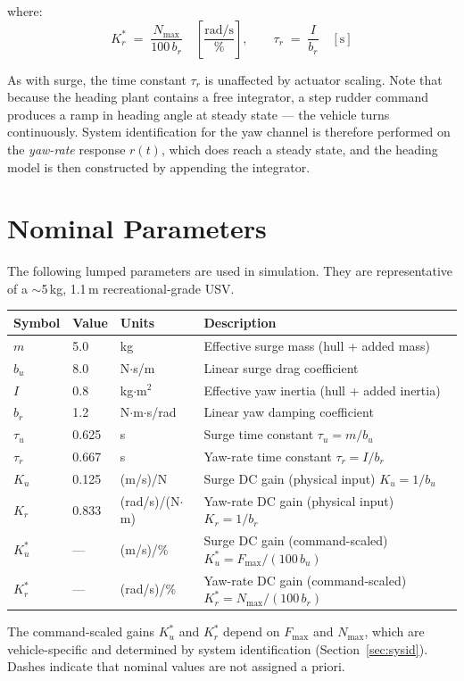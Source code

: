 \documentclass[11pt]{article}
\begin{document}
where:
\[
  K_r^* \;=\; \frac{N_{\max}}{100\,b_r}
  \quad \left[\frac{\mathrm{rad/s}}{\%}\right],
  \qquad
  \tau_r \;=\; \frac{I}{b_r} \quad [\mathrm{s}]
\]

As with surge, the time constant $\tau_r$ is unaffected by actuator
scaling.  Note that because the heading plant contains a free integrator,
a step rudder command produces a ramp in heading angle at steady state ---
the vehicle turns continuously.  System identification for the yaw channel
is therefore performed on the \emph{yaw-rate} response $r(t)$, which does
reach a steady state, and the heading model is then constructed by
appending the integrator.

\section{Nominal Parameters}

The following lumped parameters are used in simulation.  They are
representative of a \(\sim\)5\,kg, 1.1\,m recreational-grade USV.

\vspace{6pt}
\begin{center}
\begin{tabular}{C{1.5cm} C{1.5cm} C{2.8cm} L{7.4cm}}
  \textbf{Symbol} & \textbf{Value} & \textbf{Units} & \textbf{Description} \\
  \midrule
  $m$       & 5.0   & kg                    & Effective surge mass (hull + added mass) \\
  $b_u$     & 8.0   & N$\cdot$s/m           & Linear surge drag coefficient \\
  $I$       & 0.8   & kg$\cdot$m$^2$        & Effective yaw inertia (hull + added inertia) \\
  $b_r$     & 1.2   & N$\cdot$m$\cdot$s/rad & Linear yaw damping coefficient \\
  $\tau_u$  & 0.625 & s                     & Surge time constant $\tau_u = m/b_u$ \\
  $\tau_r$  & 0.667 & s                     & Yaw-rate time constant $\tau_r = I/b_r$ \\
  $K_u$     & 0.125 & (m/s)/N               & Surge DC gain (physical input) $K_u = 1/b_u$ \\
  $K_r$     & 0.833 & (rad/s)/(N$\cdot$m)   & Yaw-rate DC gain (physical input) $K_r = 1/b_r$ \\
  $K_u^*$   & ---   & (m/s)/\%              & Surge DC gain (command-scaled) $K_u^* = F_{\max}/(100\,b_u)$ \\
  $K_r^*$   & ---   & (rad/s)/\%            & Yaw-rate DC gain (command-scaled) $K_r^* = N_{\max}/(100\,b_r)$ \\
  \bottomrule
\end{tabular}
\end{center}
\vspace{3pt}
{\small The command-scaled gains $K_u^*$ and $K_r^*$ depend on $F_{\max}$ and
$N_{\max}$, which are vehicle-specific and determined by system identification
(Section~\ref{sec:sysid}).  Dashes indicate that nominal values are not
assigned a priori.}
\vspace{6pt}
\end{document}
